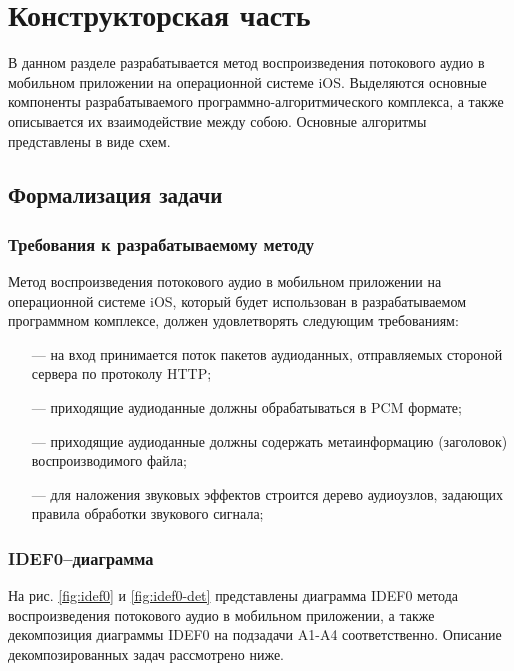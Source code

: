 \section{Конструкторская часть}
    \par В данном разделе разрабатывается метод воспроизведения потокового \newline аудио 
    в мобильном приложении на операционной системе iOS.
    Выделяются основные компоненты разрабатываемого программно-алгоритмического комплекса, 
    а также описывается их взаимодействие между собою. 
    Основные алгоритмы представлены в виде схем.

    \subsection{Формализация задачи}
        \subsubsection{Требования к разрабатываемому методу}
            \par Метод воспроизведения потокового аудио в мобильном приложении на операционной системе iOS,
            который будет использован в разрабатываемом программном комплексе, 
            должен удовлетворять следующим требованиям:
            \begin{itemize}
                \item[---] на вход принимается поток пакетов аудиоданных, отправляемых стороной сервера по протоколу HTTP;
                \item[---] приходящие аудиоданные должны обрабатываться в PCM формате;
                \item[---] приходящие аудиоданные должны содержать метаинформацию (заголовок) воспроизводимого файла;
                \item[---] для наложения звуковых эффектов строится дерево аудиоузлов, задающих правила обработки звукового сигнала;
            \end{itemize}

        \subsubsection{IDEF0–диаграмма}
            \par На рис. \ref{fig:idef0} и \ref{fig:idef0-det} представлены 
            диаграмма IDEF0 метода воспроизведения потокового аудио в мобильном приложении,
            а также декомпозиция диаграммы IDEF0 на подзадачи A1-A4 соответственно. 
            Описание декомпозированных задач рассмотрено ниже.

